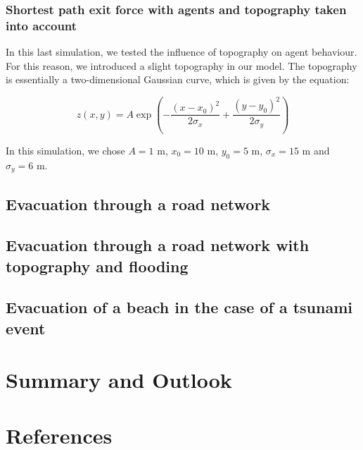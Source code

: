 \documentclass[11pt]{article}
\begin{document}
\subsubsection{Shortest path exit force with agents and topography taken into account}

In this last simulation, we tested the influence of topography on agent behaviour. For this reason, we introduced a slight topography in our model. The topography is essentially a two-dimensional Gaussian curve, which is given by the equation:

\begin{equation}
	z(x,y) = A\exp \left(- \frac{\left(x-x_0\right)^2}{2\sigma_x} + \frac{\left(y-y_0\right)^2}{2\sigma_y}\right)
\end{equation}

In this simulation, we chose $A = 1 $ m, $x_0 = 10$ m, $y_0 = 5$ m, $\sigma_x = 15$ m and $\sigma_y = 6$ m.


\subsection{Evacuation through a road network}

\subsection{Evacuation through a road network with topography and flooding}

\subsection{Evacuation of a beach in the case of a tsunami event}

\section{Summary and Outlook}


\section{References}



%
\end{document}
